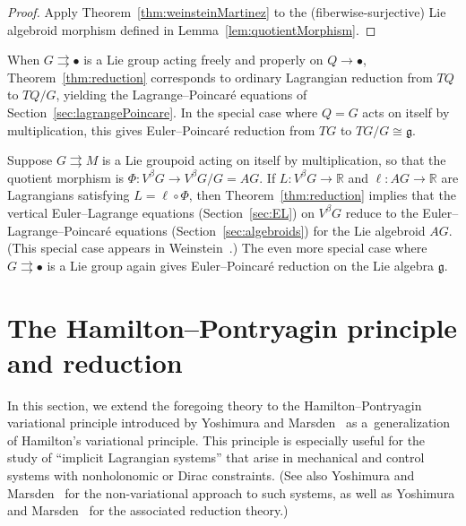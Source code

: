\documentclass[10pt,a4paper]{amsart}
\numberwithin{equation}{section}
\begin{document}
\begin{proof}
Apply Theorem~\ref{thm:weinsteinMartinez} to the (f\/iberwise-surjective) Lie algebroid morphism def\/ined in Lemma~\ref{lem:quotientMorphism}.
\end{proof}

\begin{Example} \label{ex:groupActionReduction}
When $G \rightrightarrows \bullet $ is a Lie group acting freely and properly on $ Q \rightarrow \bullet $, Theorem~\ref{thm:reduction} corresponds to ordinary Lagrangian reduction from $ T Q $ to $ T Q / G $, yielding the Lagrange--Poincar\'e equations of Section~\ref{sec:lagrangePoincare}. In the special case where $ Q = G $ acts on itself by multiplication, this gives Euler--Poincar\'e reduction from $ T G $ to $ T G / G \cong \mathfrak{g} $.
\end{Example}

\begin{Example}\label{ex:groupoidSelfReduction}
Suppose $G \rightrightarrows M $ is a Lie groupoid acting on itself by multiplication, so that the quotient morphism is $ \Phi \colon V ^\beta G \rightarrow V ^\beta G / G = A G $. If $ L \colon V ^\beta G \rightarrow \mathbb{R} $ and $ \ell \colon A G \rightarrow \mathbb{R} $ are Lagrangians satisfying $ L = \ell \circ \Phi $, then Theorem~\ref{thm:reduction} implies that the vertical Euler--Lagrange equations (Section~\ref{sec:EL}) on $ V ^\beta G $ reduce to the Euler--Lagrange--Poincar\'e equations (Section~\ref{sec:algebroids}) for the Lie algebroid $ A G $. (This special case appears in Weinstein~\cite[Theorem~5.3]{Weinstein1996}.) The even more special case where $ G \rightrightarrows \bullet $ is a Lie group again gives Euler--Poincar\'e reduction on the Lie algebra $ \mathfrak{g} $.
\end{Example}

\section{The Hamilton--Pontryagin principle and reduction}\label{sec:HP}

In this section, we extend the foregoing theory to the Hamilton--Pontryagin variational principle introduced by Yoshimura and Marsden~\cite{YoMa2006b} as a~generalization of Hamilton's variational principle. This principle is especially useful for the study of ``implicit Lagrangian systems'' that arise in mechanical and control systems with nonholonomic or Dirac constraints. (See also Yoshimura and Marsden~\cite{YoMa2006a} for the non-variational approach to such systems, as well as Yoshimura and Marsden~\cite{YoMa2007} for the associated reduction theory.)
\end{document}
